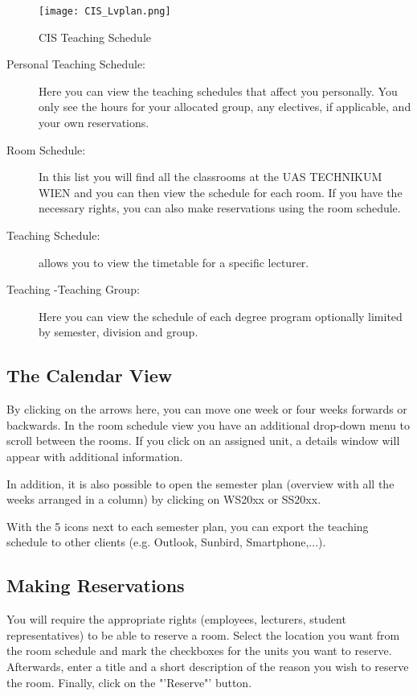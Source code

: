 \begin{figure}
	\centering
	\texttt{[image: CIS\_Lvplan.png]}
	\caption{CIS Teaching Schedule}
	\label{CIS_Teaching_Plan}
\end{figure}

\begin{description}
	\item [Personal Teaching Schedule:] Here you can view the teaching schedules that affect you personally. You only see the hours for your allocated group, any electives, if applicable, and your own reservations.
	\item [Room Schedule:] In this list you will find all the classrooms at the UAS TECHNIKUM WIEN and you can then view the schedule for each room. If you have the necessary rights, you can also make reservations using the room schedule.
	\item [Teaching Schedule:] allows you to view the timetable for a specific lecturer.
	\item [Teaching -Teaching Group:] Here you can view the schedule of each degree program optionally limited by semester, division and group.
\end{description}

\subsection{The Calendar View}

By clicking on the arrows here, you can move one week or four weeks forwards or backwards.
In the room schedule view you have an additional drop-down menu to scroll between the rooms.
If you click on an assigned unit, a details window will appear with additional information.

In addition, it is also possible to open the semester plan (overview with all the weeks arranged in a column) by clicking on WS20xx or SS20xx.

With the 5 icons next to each semester plan, you can export the teaching schedule to other clients (e.g. Outlook, Sunbird, Smartphone,...).

\subsection{Making Reservations}

You will require the appropriate rights (employees, lecturers, student representatives) to be able to reserve a room.
Select the location you want from the room schedule and mark the checkboxes for the units you want to reserve.
Afterwards, enter a title and a short description of the reason you wish to reserve the room.
Finally, click on the "'Reserve"' button.

